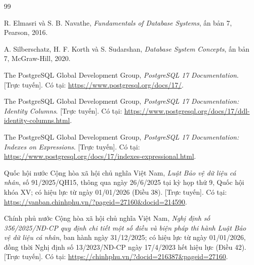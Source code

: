 \renewcommand{\refname}{Tài liệu tham khảo}
{}
\begin{thebibliography}{99}
\raggedright
{}

R. Elmasri và S. B. Navathe, \textit{Fundamentals of Database Systems}, ấn bản 7, Pearson, 2016.

A. Silberschatz, H. F. Korth và S. Sudarshan, \textit{Database System Concepts}, ấn bản 7, McGraw-Hill, 2020.

The PostgreSQL Global Development Group, \textit{PostgreSQL 17 Documentation}. [Trực tuyến]. Có tại: \url{https://www.postgresql.org/docs/17/}.

The PostgreSQL Global Development Group, \textit{PostgreSQL 17 Documentation: Identity Columns}. [Trực tuyến]. Có tại: \url{https://www.postgresql.org/docs/17/ddl-identity-columns.html}.

The PostgreSQL Global Development Group, \textit{PostgreSQL 17 Documentation: Indexes on Expressions}. [Trực tuyến]. Có tại: \url{https://www.postgresql.org/docs/17/indexes-expressional.html}.

Quốc hội nước Cộng hòa xã hội chủ nghĩa Việt Nam, \textit{Luật Bảo vệ dữ liệu cá nhân}, số 91/2025/QH15, thông qua ngày 26/6/2025 tại kỳ họp thứ 9, Quốc hội khóa XV; có hiệu lực từ ngày 01/01/2026 (Điều 38). [Trực tuyến]. Có tại: \url{https://vanban.chinhphu.vn/?pageid=27160&docid=214590}.

Chính phủ nước Cộng hòa xã hội chủ nghĩa Việt Nam, \textit{Nghị định số 356/2025/NĐ-CP quy định chi tiết một số điều và biện pháp thi hành Luật Bảo vệ dữ liệu cá nhân}, ban hành ngày 31/12/2025; có hiệu lực từ ngày 01/01/2026, đồng thời Nghị định số 13/2023/NĐ-CP ngày 17/4/2023 hết hiệu lực (Điều 42). [Trực tuyến]. Có tại: \url{https://chinhphu.vn/?docid=216387&pageid=27160}.

\end{thebibliography}
